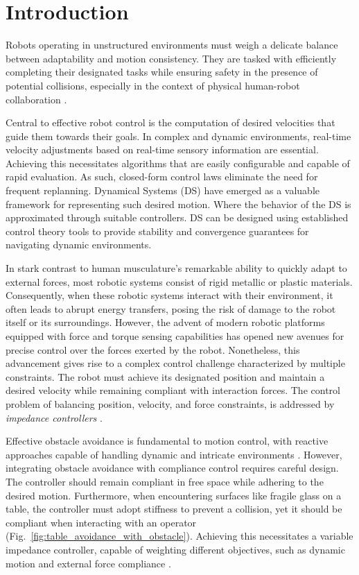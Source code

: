 \section{Introduction}
Robots operating in unstructured environments must weigh a delicate balance between adaptability and motion consistency. They are tasked with efficiently completing their designated tasks while ensuring safety in the presence of potential collisions, especially in the context of physical human-robot collaboration \parencite{ajoudani2018progress}.

Central to effective robot control is the computation of desired velocities that guide them towards their goals. In complex and dynamic environments, real-time velocity adjustments based on real-time sensory information are essential. Achieving this necessitates algorithms that are easily configurable and capable of rapid evaluation. As such, closed-form control laws eliminate the need for frequent replanning. Dynamical Systems (DS) have emerged as a valuable framework for representing such desired motion. Where the behavior of the DS is approximated through suitable controllers. DS can be designed using established control theory tools to provide stability and convergence guarantees for navigating dynamic environments.

In stark contrast to human musculature's remarkable ability to quickly adapt to external forces, most robotic systems consist of rigid metallic or plastic materials. Consequently, when these robotic systems interact with their environment, it often leads to abrupt energy transfers, posing the risk of damage to the robot itself or its surroundings. However, the advent of modern robotic platforms equipped with force and torque sensing capabilities has opened new avenues for precise control over the forces exerted by the robot.
Nonetheless, this advancement gives rise to a complex control challenge characterized by multiple constraints. The robot must achieve its designated position and maintain a desired velocity while remaining compliant with interaction forces. The control problem of balancing position, velocity, and force constraints, is addressed by \textit{impedance controllers} \parencite{takegaki1981new, hogan1984impedance}.

Effective obstacle avoidance is fundamental to motion control, with reactive approaches capable of handling dynamic and intricate environments \parencite{huber2019avoidance, huber2022avoiding}. However, integrating obstacle avoidance with compliance control requires careful design. The controller should remain compliant in free space while adhering to the desired motion. Furthermore, when encountering surfaces like fragile glass on a table, the controller must adopt stiffness to prevent a collision, yet it should be compliant when interacting with an operator (Fig.~\ref{fig:table_avoidance_with_obstacle}). Achieving this necessitates a variable impedance controller, capable of weighting different objectives, such as dynamic motion and external force compliance \parencite{kronander2015passive}.

